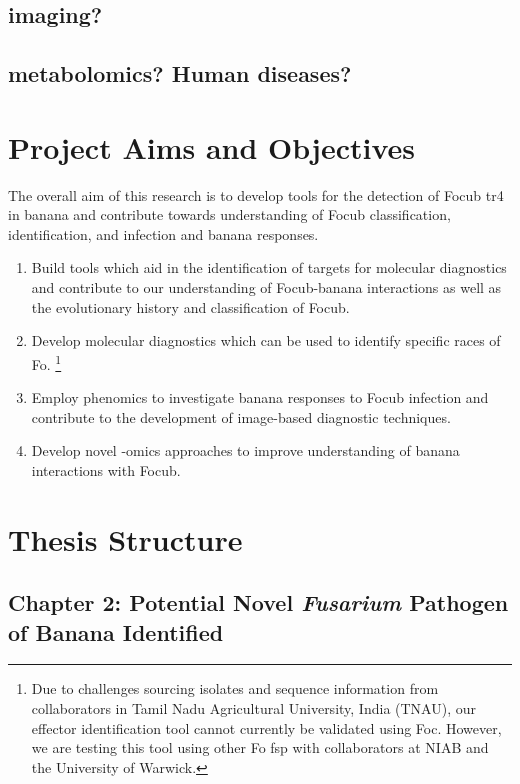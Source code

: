 {\subsection{imaging?}
\subsection{metabolomics? Human diseases?}


\newpage
\section{Project Aims and Objectives}

The overall aim of this research is to develop tools for the detection of \acl{Focub} \ac{tr4} in banana and contribute towards understanding of \acl{Focub} classification, identification, and infection and banana responses. 

\begin{enumerate}
    \item Build tools which aid in the identification of targets for molecular diagnostics and contribute to our understanding of \ac{Focub}-banana interactions as well as the evolutionary history and classification of \ac{Focub}. 
    \item Develop molecular diagnostics which can be used to identify specific races of \acl{Fo}. \footnote{Due to challenges sourcing isolates and sequence information from collaborators in Tamil Nadu Agricultural University, India (TNAU), our effector identification tool cannot currently be validated using Foc. However, we are testing this tool using other \acl{Fo} \ac{fsp} with collaborators at NIAB and the University of Warwick.}
    \item Employ phenomics to investigate banana responses to \ac{Focub} infection and contribute to the development of image-based diagnostic techniques.  
    \item Develop novel -omics approaches to improve understanding of banana interactions with \ac{Focub}.  
\end{enumerate}

\newpage
\section{Thesis Structure}

\subsection{Chapter 2: Potential Novel \textit{Fusarium} Pathogen of Banana Identified} 

}
